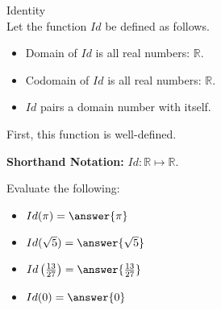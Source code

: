\documentclass{ximera}
\begin{document}
\begin{example} Identity \\

Let the function $Id$ be defined as follows.


\begin{itemize}
\item Domain of $Id$ is all real numbers: $\mathbb{R}$.
\item Codomain of $Id$ is all real numbers: $\mathbb{R}$.
\item $Id$ pairs a domain number with itself.
\end{itemize}


First, this function is well-defined.


\textbf{Shorthand Notation: } $Id: \mathbb{R} \mapsto \mathbb{R}$.

\begin{question}
Evaluate the following:

\begin{itemize}
	\item $Id(\pi) = \answer{\pi}$
	\item $Id(\sqrt{5}) = \answer{\sqrt{5}}$
	\item $Id\left(\frac{13}{27}\right) = \answer{\frac{13}{27}}$
	\item $Id(0) = \answer{0}$
\end{itemize}

\end{question}

\end{example}
\end{document}
